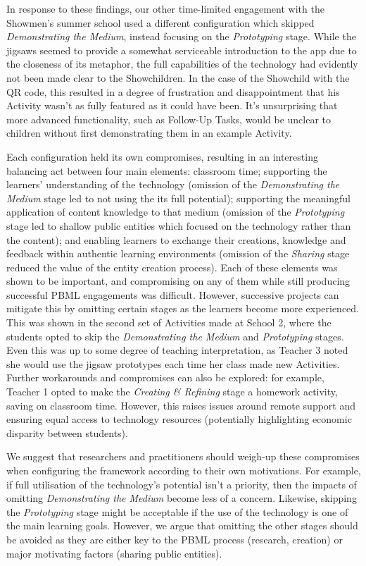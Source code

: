 \documentclass[,hyphens]{sigchi}
\begin{document}
In response to these findings, our other time-limited engagement with the Showmen's summer school used a different configuration which skipped \textit{Demonstrating the Medium}, instead focusing on the \textit{Prototyping} stage. While the jigsaws seemed to provide a somewhat serviceable introduction to the app due to the closeness of its metaphor, the full capabilities of the technology had evidently not been made clear to the Showchildren. In the case of the Showchild with the QR code, this resulted in a degree of frustration and disappointment that his Activity wasn't as fully featured as it could have been. It's unsurprising that more advanced functionality, such as Follow-Up Tasks, would be unclear to children without first demonstrating them in an example Activity.

Each configuration held its own compromises, resulting in an interesting balancing act between four main elements: classroom time; supporting the learners' understanding of the technology (omission of the \textit{Demonstrating the Medium} stage led to not using the its full potential); supporting the meaningful application of content knowledge to that medium (omission of the \textit{Prototyping} stage led to shallow public entities which focused on the technology rather than the content); and enabling learners to exchange their creations, knowledge and feedback within authentic learning environments (omission of the \textit{Sharing} stage reduced the value of the entity creation process). Each of these elements was shown to be important, and compromising on any of them while still producing successful PBML engagements was difficult. However, successive projects can mitigate this by omitting certain stages as the learners become more experienced. This was shown in the second set of Activities made at School 2, where the students opted to skip the \textit{Demonstrating the Medium} and \textit{Prototyping} stages. Even this was up to some degree of teaching interpretation, as Teacher 3 noted she would use the jigsaw prototypes each time her class made new Activities. Further workarounds and compromises can also be explored: for example, Teacher 1 opted to make the \textit{Creating \& Refining} stage a homework activity, saving on classroom time. However, this raises issues around remote support and ensuring equal access to technology resources (potentially highlighting economic disparity between students).

We suggest that researchers and practitioners should weigh-up these compromises when configuring the framework according to their own motivations. For example, if full utilisation of the technology's potential isn't a priority, then the impacts of omitting \textit{Demonstrating the Medium} become less of a concern. Likewise, skipping the \textit{Prototyping} stage might be acceptable if the use of the technology is one of the main learning goals. However, we argue that omitting the other stages should be avoided as they are either key to the PBML process (research, creation) or major motivating factors (sharing public entities).
\end{document}
